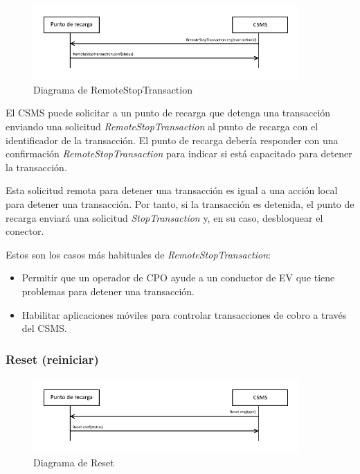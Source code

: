 \documentclass[12pt,a4paper,onecolumn,oneside]{report}
\begin{document}
\begin{figure}[H] 
\centering
  \includegraphics[width=0.9\textwidth]{figuras/diagramaremotestoptransaction.png}
  \caption[Diagrama de \textit{RemoteStopTransaction}]{Diagrama de RemoteStopTransaction\\
  }
  \label{fig:diagramaremotestoptransaction}
\end{figure}


El CSMS puede solicitar a un punto de recarga que detenga una transacción enviando una solicitud \textit{RemoteStopTransaction} al punto de recarga con el identificador de la transacción. El punto de recarga debería responder con una confirmación \textit{RemoteStopTransaction} para indicar si está capacitado para detener la transacción.

Esta solicitud remota para detener una transacción es igual a una acción local para detener una transacción. Por tanto, si la transacción es detenida, el punto de recarga enviará una solicitud \textit{StopTransaction} y, en su caso, desbloquear el conector.

Estos son los casos más habituales de \textit{RemoteStopTransaction}:
\begin{itemize}
\item Permitir que un operador de CPO ayude a un conductor de EV que tiene problemas para detener una transacción.
\item Habilitar aplicaciones móviles para controlar transacciones de cobro a través del CSMS.

\end{itemize}


\subsubsection{Reset (reiniciar)}
\label{Reset (reiniciar)}


\begin{figure}[H] 
\centering
  \includegraphics[width=0.9\textwidth]{figuras/diagramareset.png}
  \caption[Diagrama de \textit{Reset}]{Diagrama de Reset\\
  }
  \label{fig:diagramareset}
\end{figure}
\end{document}
